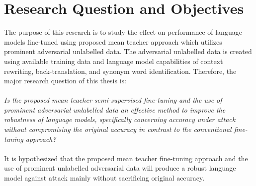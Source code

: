 \documentclass[%
	BCOR=8mm, %
	DIV=12,
	toc=bibliography, %
	toc=listof, %
	oneside, %
	egregdoesnotlikesansseriftitles, %
	]{scrbook}
\begin{document}
\section{Research Question and Objectives}
\label{section:researchquestions}
The purpose of this research is to study the effect on performance of language models fine-tuned using proposed mean teacher approach which utilizes prominent adversarial unlabelled data. The adversarial unlabelled data is created using available training data and language model capabilities of context rewriting, back-translation, and synonym word identification. Therefore, the major research question of this thesis is: \\\\
 \emph{Is the proposed mean teacher semi-supervised fine-tuning and the use of prominent adversarial unlabelled data an effective method to improve the robustness of language models, specifically concerning accuracy under attack without compromising the original accuracy in contrast to the conventional fine-tuning approach?}\\\\
It is hypothesized that the proposed mean teacher  fine-tuning approach and the use of prominent unlabelled adversarial data will produce a robust language model against attack mainly without sacrificing original accuracy. \\
\end{document}
